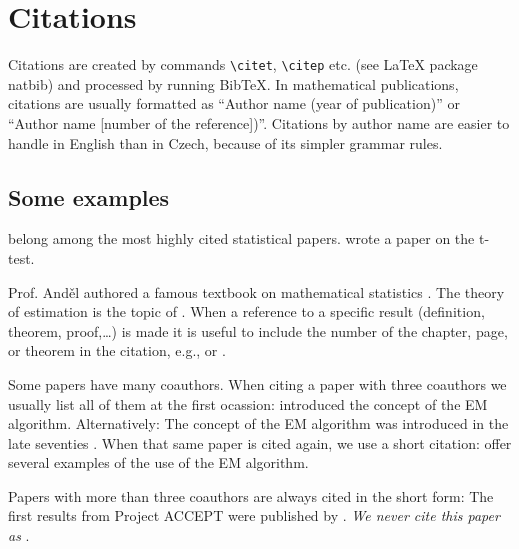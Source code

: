 
\chapter{Citations}

Citations are created by commands
\texttt{{\textbackslash}citet}, \texttt{{\textbackslash}citep} etc.
(see {\LaTeX} package \textsf{natbib}) and processed by running
Bib{\TeX}. In mathematical publications, citations are usually
formatted as ``Author name (year of publication)'' or ``Author name
[number of the reference])''. Citations by author name are easier to
handle in English than in Czech, because of its simpler grammar rules.



\section{Some examples}

\citet{KaplanMeier58, Cox72} belong among the most highly cited statistical papers.
\citet{Student08} wrote a paper on the t-test. 

Prof. And\v{e}l authored a famous textbook on mathematical statistics
\citep[see][]{Andel98}. The theory of estimation is the topic of
\citet{LehmannCasella98}. When a reference to a specific result
(definition, theorem, proof,\ldots) is made it is useful to include the
number of the chapter, page, or theorem in the citation, e.g.,
\citet[Theorem 4.22]{Andel07} or \citep[see][Chapter~4]{Andel07}.

Some papers have many coauthors. When citing a paper with three
coauthors we usually list all of them at the first ocassion:
\citet*{DempsterLairdRubin77} introduced the concept of the EM
algorithm. Alternatively: The concept of the EM algorithm was
introduced in the late seventies \citep*{DempsterLairdRubin77}. When
that same paper is cited again, we use a short citation:
\citet{DempsterLairdRubin77} offer several examples of the use of the
EM algorithm.

Papers with more than three coauthors are always cited in the short form:
The first results from Project ACCEPT were published by 
\citet{Genberget08}. \emph{We never cite this paper as} \citet*{Genberget08}.
